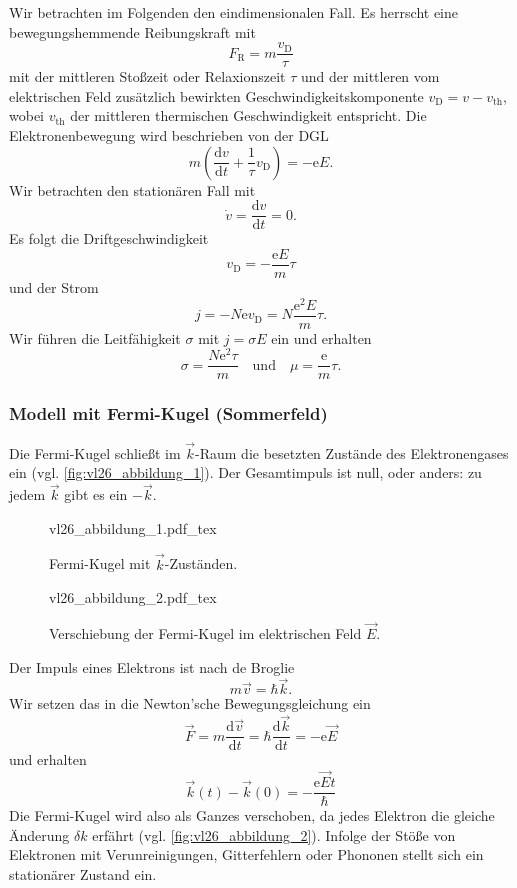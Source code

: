 	Wir betrachten im Folgenden den eindimensionalen Fall. Es herrscht eine bewegungshemmende Reibungskraft mit
	$$
	F_{\text{R}} = m \frac{v_{\mathrm{D}}}{\tau }
	$$ 
	mit der mittleren Stoßzeit oder Relaxionszeit $\tau $ und der mittleren vom elektrischen Feld zusätzlich bewirkten Geschwindigkeitskomponente $v_{\mathrm{D}}= v- v_{\text{th}}$, wobei $v_{\text{th}}$ der mittleren thermischen Geschwindigkeit entspricht. Die Elektronenbewegung wird beschrieben von der DGL
	$$
	m\left( \frac{\mathrm{d}v}{\mathrm{d}t} + \frac{1}{\tau } v_{\mathrm{D}} \right) = - \mathrm{e} E.
	$$ 
	Wir betrachten den stationären Fall mit
	$$
	\dot{v} = \frac{\mathrm{d}v}{\mathrm{d}t}= 0.
	$$
	Es folgt die Driftgeschwindigkeit
	$$
	v_{\mathrm{D}} = - \frac{\mathrm{e}E}{m} \tau 
	$$ 
	und der Strom
	$$
	j = - N \mathrm{e} v_{\mathrm{D}} = N \frac{\mathrm{e}^2 E}{m} \tau .
	$$ 
	Wir führen die Leitfähigkeit $\sigma$ mit $j = \sigma E$ ein und erhalten
	\begin{equation}
		\label{eq:II.7.25}
		\sigma = \frac{N \mathrm{e}^2 \tau }{m} \quad\text{und}\quad\mu = \frac{\mathrm{e}}{m} \tau.
	\end{equation}

\subsubsection{Modell mit Fermi-Kugel (Sommerfeld)}
	Die Fermi-Kugel schließt im $\Vec{k}$-Raum die besetzten Zustände des Elektronengases ein (vgl. \autoref{fig:vl26_abbildung_1}). 
	Der Gesamtimpuls ist null, oder anders: zu jedem $\Vec{k}$ gibt es ein $-\Vec{k}$.

	\begin{figure}[H]
		\centering
		\def\svgwidth{.377\columnwidth}
		{vl26_abbildung_1.pdf_tex}
		\caption{Fermi-Kugel mit $\vec k$-Zuständen.}
		\label{fig:vl26_abbildung_1}
	\end{figure}

	\begin{figure}[H]
		\centering
		\def\svgwidth{.656\columnwidth}
		{vl26_abbildung_2.pdf_tex}
		\caption{Verschiebung der Fermi-Kugel im elektrischen Feld $\vec E$.}
		\label{fig:vl26_abbildung_2}
	\end{figure}

	Der Impuls eines Elektrons ist nach de Broglie
	$$
	m\Vec{v} = \hbar  \Vec{k}.
	$$ 
	Wir setzen das in die Newton'sche Bewegungsgleichung ein
	$$
		\Vec{F} = m \frac{\mathrm{d}\Vec{v}}{\mathrm{d}t} = \hbar  \frac{\mathrm{d}\Vec{k}}{\mathrm{d}t} = - \mathrm{e} \Vec{E}
	$$
	und erhalten 
	$$
		\Vec{k}(t) - \Vec{k}(0) = - \frac{\mathrm{e} \Vec{E} t}{\hbar }
	$$
	Die Fermi-Kugel wird also als Ganzes verschoben, da jedes Elektron die gleiche Änderung $\delta k$ erfährt (vgl. 
	\autoref{fig:vl26_abbildung_2}). 
	Infolge der Stöße von Elektronen mit Verunreinigungen, Gitterfehlern oder Phononen stellt sich ein stationärer Zustand ein.

